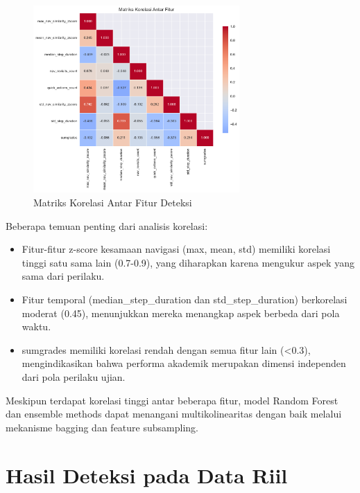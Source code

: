 \begin{figure}[htbp]
\centering
    \includegraphics[width=0.7\textwidth]{figures/feature_correlation_heatmap.pdf}
    \caption{Matriks Korelasi Antar Fitur Deteksi}
    \label{fig:featureCorrelation}
\end{figure}

Beberapa temuan penting dari analisis korelasi:
\begin{itemize}
    \item Fitur-fitur z-score kesamaan navigasi (max, mean, std) memiliki korelasi tinggi satu sama lain (0.7-0.9), yang diharapkan karena mengukur aspek yang sama dari perilaku.
    \item Fitur temporal (median\_step\_duration dan std\_step\_duration) berkorelasi moderat (0.45), menunjukkan mereka menangkap aspek berbeda dari pola waktu.
    \item sumgrades memiliki korelasi rendah dengan semua fitur lain (<0.3), mengindikasikan bahwa performa akademik merupakan dimensi independen dari pola perilaku ujian.
\end{itemize}

Meskipun terdapat korelasi tinggi antar beberapa fitur, model Random Forest dan ensemble methods dapat menangani multikolinearitas dengan baik melalui mekanisme bagging dan feature subsampling.

\section{Hasil Deteksi pada Data Riil}
\label{sec:hasilDeteksiDataRiil}

